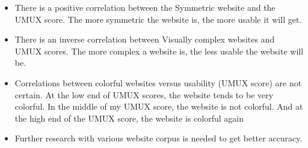\documentclass[conference]{IEEEtran}
\begin{document}
\begin{itemize}
    \item There is a positive correlation between the Symmetric website and the UMUX score. The more symmetric the website is, the more usable it will get.
    \item There is an inverse correlation between Visually complex websites and UMUX scores. The more complex a website is, the less usable the website will be.
    \item Correlations between colorful websites versus usability (UMUX score) are not certain. At the low end of UMUX scores, the website tends to be very colorful. In the middle of my UMUX score, the website is not colorful. And at the high end of the UMUX score, the website is colorful again
    \item Further research with various website corpus is needed to get better accuracy.
\end{itemize}





% 




\end{document}
